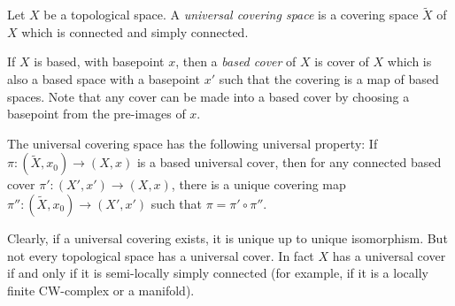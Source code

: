 \documentclass{article}
\begin{document}
Let $X$ be a topological space.  A {\em universal covering space} is a covering space $\tilde{X}$ of $X$ which is connected and simply connected. 

If $X$ is based, with basepoint $x$, then a {\em based cover} of $X$ is cover of $X$ which is also a based space with a basepoint $x'$ such that the covering is a map of based spaces. Note that any cover can be made into a based cover by choosing a basepoint from the pre-images of $x$.

The universal covering space has the following universal property: If $\pi:(\tilde X,x_0)\to(X,x)$ is a based universal cover, then for any connected based cover $\pi':(X',x')\to (X,x)$, there is a unique covering map $\pi'':(\tilde X,x_0)\to(X',x')$ such that $\pi=\pi'\circ\pi''$.

Clearly, if a universal covering exists, it is unique up to unique isomorphism.  But not every topological space has a universal cover.  In fact $X$ has a universal cover if and only if it is semi-locally simply connected (for example, if it is a locally finite CW-complex or a manifold).
\end{document}
